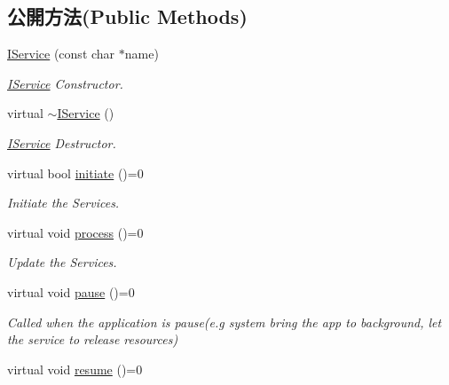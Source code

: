 \subsection*{公開方法(Public Methods)}
\begin{DoxyCompactItemize}
\item 
\hyperlink{class_i_dream_sky_1_1_i_service_a1aac9e145dbdf43cb9c9e40d815139f6}{I\+Service} (const char $\ast$name)
\begin{DoxyCompactList}\small\item\em \hyperlink{class_i_dream_sky_1_1_i_service}{I\+Service} Constructor. \end{DoxyCompactList}\item 
virtual \hyperlink{class_i_dream_sky_1_1_i_service_a76b0f503e4627f25af465e3a72569d70}{$\sim$\+I\+Service} ()
\begin{DoxyCompactList}\small\item\em \hyperlink{class_i_dream_sky_1_1_i_service}{I\+Service} Destructor. \end{DoxyCompactList}\item 
virtual bool \hyperlink{class_i_dream_sky_1_1_i_service_ac409218db5b5c15a585dbff362cfe628}{initiate} ()=0
\begin{DoxyCompactList}\small\item\em Initiate the Services. \end{DoxyCompactList}\item 
virtual void \hyperlink{class_i_dream_sky_1_1_i_service_ab8bf75e4013087264d05bcf24c1e6d62}{process} ()=0\hypertarget{class_i_dream_sky_1_1_i_service_ab8bf75e4013087264d05bcf24c1e6d62}{}\label{class_i_dream_sky_1_1_i_service_ab8bf75e4013087264d05bcf24c1e6d62}

\begin{DoxyCompactList}\small\item\em Update the Services. \end{DoxyCompactList}\item 
virtual void \hyperlink{class_i_dream_sky_1_1_i_service_a3708c8f5becfaf53d616d0cf69f31ba3}{pause} ()=0\hypertarget{class_i_dream_sky_1_1_i_service_a3708c8f5becfaf53d616d0cf69f31ba3}{}\label{class_i_dream_sky_1_1_i_service_a3708c8f5becfaf53d616d0cf69f31ba3}

\begin{DoxyCompactList}\small\item\em Called when the application is pause(e.\+g system bring the app to background, let the service to release resources) \end{DoxyCompactList}\item 
virtual void \hyperlink{class_i_dream_sky_1_1_i_service_ae25ed747606a9c0664755ec054178b9f}{resume} ()=0\hypertarget{class_i_dream_sky_1_1_i_service_ae25ed747606a9c0664755ec054178b9f}{}\label{class_i_dream_sky_1_1_i_service_ae25ed747606a9c0664755ec054178b9f}


\end{DoxyCompactItemize}
